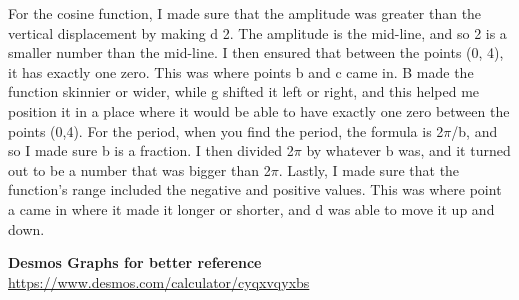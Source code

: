 \documentclass[pstricks,border=11pt]{article}
\begin{document}
\vspace{5mm}
\begin{center}
\end{center}
\vspace{5mm}

For the cosine function, I made sure that the amplitude was greater than the vertical displacement by making d 2. The amplitude is the mid-line, and so 2 is a smaller number than the mid-line. I then ensured that between the points (0, 4), it has exactly one zero. This was where points b and c came in. B made the function skinnier or wider, while g shifted it left or right, and this helped me position it in a place where it would be able to have exactly one zero between the points (0,4). For the period, when you find the period, the formula is 2$\pi$/b, and so I made sure b is a fraction. I then divided 2$\pi$ by whatever b was, and it turned out to be a number that was bigger than 2$\pi$. Lastly, I made sure that the function's range included the negative and positive values. This was where point a came in where it made it longer or shorter, and d was able to move it up and down.

\vfill
\hfill \break
\textbf{Desmos Graphs for better reference}
\hfill \break
\url{https://www.desmos.com/calculator/cyqxvqyxbs}
\end{document}
